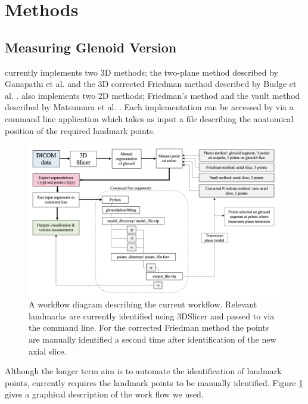 \section{Methods}
\subsection{Measuring Glenoid Version}
\label{sec:methods}
\sksglenoid currently implements two 3D methods; the two-plane method described by Ganapathi et al. \cite{PMID:20933439} and the 3D corrected 
Friedman method described by Budge et al. \cite{BUDGE2011577}. \sksglenoid also implements two
2D methods; Friedman's method \cite{PMID:1522089} and the vault method described by Matsumura et al. \cite{PMID:24618285}. Each implementation can be accessed by via a command line application which takes as 
input a file describing the anatomical position of the required landmark points.

\begin{figure}
        \begin{center}
                \includegraphics[width=0.85\linewidth]{figures/workflow.png}
                        \caption{\label{fig:workflow}A workflow diagram describing the current workflow. Relevant landmarks 
			are currently identified using 3DSlicer and passed to \sksglenoid via the command line. For the corrected Friedman method the points are manually identified 
			a second time after identification of the new axial slice.}
        \end{center}
\end{figure}

Although the longer term aim is to automate the identification of landmark points, \sksglenoid currently requires the landmark points to be manually identified. 
Figure \ref{fig:workflow} gives a graphical description of the work flow we used. 

